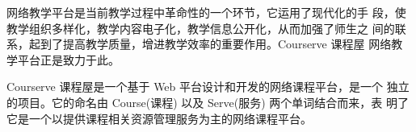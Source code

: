 网络教学平台是当前教学过程中革命性的一个环节，它运用了现代化的手 段，使教学组织多样化，教学内容电子化，教学信息公开化，从而加强了师生之 间的联系，起到了提高教学质量，增进教学效率的重要作用。Courserve 课程屋 网络教学平台正是致力于此。

Courserve 课程屋是一个基于 Web 平台设计和开发的网络课程平台，是一个 独立的项目。它的命名由 Course(课程) 以及 Serve(服务) 两个单词结合而来，表 明了它是一个以提供课程相关资源管理服务为主的网络课程平台。